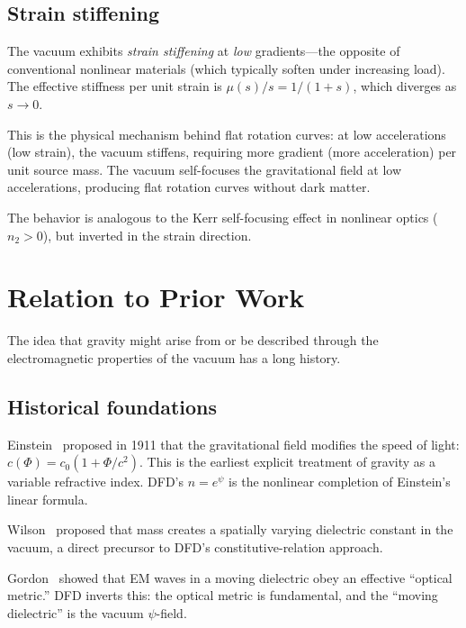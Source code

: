 \documentclass[aps,prd,twocolumn,superscriptaddress,nofootinbib]{revtex4-2}
\begin{document}
\subsection{Strain stiffening}

The vacuum exhibits \emph{strain stiffening} at \emph{low}
gradients---the opposite of conventional nonlinear materials (which
typically soften under increasing load).  The effective stiffness per
unit strain is $\mu(s)/s = 1/(1+s)$, which diverges as $s \to 0$.

This is the physical mechanism behind flat rotation curves: at low
accelerations (low strain), the vacuum stiffens, requiring more
gradient (more acceleration) per unit source mass.  The vacuum
self-focuses the gravitational field at low accelerations, producing
flat rotation curves without dark matter.

The behavior is analogous to the Kerr self-focusing effect in
nonlinear optics ($n_2 > 0$), but inverted in the strain direction.


\section{Relation to Prior Work}
\label{sec:prior-work}

The idea that gravity might arise from or be described through the
electromagnetic properties of the vacuum has a long history.

\subsection{Historical foundations}

Einstein~\cite{Einstein1911} proposed in 1911 that the gravitational
field modifies the speed of light:
$c(\Phi) = c_0(1 + \Phi/c^2)$.  This is the earliest explicit
treatment of gravity as a variable refractive index.  DFD's
$n = e^\psi$ is the nonlinear completion of Einstein's linear formula.

Wilson~\cite{Wilson1921} proposed that mass creates a spatially
varying dielectric constant in the vacuum, a direct precursor to
DFD's constitutive-relation approach.

Gordon~\cite{Gordon1923} showed that EM waves in a moving dielectric
obey an effective ``optical metric.''  DFD inverts this: the optical
metric is fundamental, and the ``moving dielectric'' is the vacuum
$\psi$-field.
\end{document}
